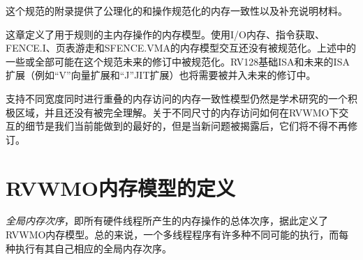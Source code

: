 这个规范的附录提供了公理化的和操作规范化的内存一致性以及补充说明材料。

\begin{commentary}
  这章定义了用于规则的主内存操作的内存模型。使用I/O内存、指令获取、FENCE.I、页表游走和SFENCE.VMA的内存模型交互还没有被规范化。上述中的一些或全部可能在这个规范未来的修订中被规范化。RV128基础ISA和未来的ISA扩展（例如“V”向量扩展和“J”JIT扩展）也将需要被并入未来的修订中。

  支持不同宽度同时进行重叠的内存访问的内存一致性模型仍然是学术研究的一个积极区域，并且还没有被完全理解。关于不同尺寸的内存访问如何在RVWMO下交互的细节是我们当前能做到的最好的，但是当新问题被揭露后，它们将不得不再修订。
\end{commentary}

\section{RVWMO内存模型的定义}
\label{sec:rvwmo}

{\em 全局内存次序}，即所有硬件线程所产生的内存操作的总体次序，据此定义了RVWMO内存模型。总的来说，一个多线程程序有许多种不同可能的执行，而每种执行有其自己相应的全局内存次序。

